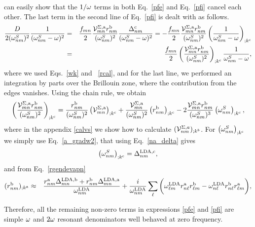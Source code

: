 \documentclass{article}
\begin{document}
can easily show that the $1/\omega$ terms in both Eq.~\eqref{pfe} and Eq.~\eqref{pfi}
cancel each other.
The last term in the second line of Eq.~\eqref{pfi} is dealt with as
follows.
\begin{eqnarray}\label{dresn}
\frac{D}{2(\omega^S_{nm})^2}\frac{1}{(\omega^S_{nm}-\omega)^2}
&=&
\frac{f_{mn}}{2}\frac{{\mathbf{\cal V}}^{\Sigma,\mathrm{a}}_{mn}r^{\mathrm{b}}_{nm}}{(\omega^S_{nm})^2}
\frac{\Delta^{\mathrm{c}}_{nm}}{(\omega^S_{nm}-\omega)^2} 
=
-
\frac{f_{mn}}{2}
\frac{{\mathbf{\cal V}}^{\Sigma,\mathrm{a}}_{mn}r^{\mathrm{b}}_{nm}}{(\omega^S_{nm})^2}
\left(
\frac{1}{\omega^S_{nm}-\omega}
\right)_{;k^{\mathrm{c}}}
\nonumber\\
&=&
\frac{f_{mn}}{2}
\left(
\frac{{\mathbf{\cal V}}^{\Sigma,\mathrm{a}}_{mn}r^{\mathrm{b}}_{nm}}{(\omega^S_{nm})^2}
\right)_{;k^{\mathrm{c}}}
\frac{1}{\omega^S_{nm}-\omega}
,
\end{eqnarray} 
where we used Eqs.~\eqref{wk} and ~\eqref{rcal}, and for the last
line, we performed an
integration by parts over the Brillouin zone,
where the contribution from the edges vanishes.\cite{ashcroft_solid_1976}
Using the chain rule, we obtain
\begin{eqnarray}\label{chrn1}
\left(
\frac{{\mathbf{\cal V}}^{\Sigma,\mathrm{a}}_{mn}r^{\mathrm{b}}_{nm}}{(\omega^S_{nm})^2}
\right)_{;k^{\mathrm{c}}}
=
\frac{r^{\mathrm{b}}_{nm}}{(\omega^S_{nm})^2}
\left(
{\mathbf{\cal V}} ^{\Sigma,\mathrm{a}}_{mn}
\right)_{;k^{\mathrm{c}}}
+
\frac{{\mathbf{\cal V}}^{\Sigma,\mathrm{a}}_{mn}}{(\omega^S_{nm})^2}
\left(
r^{\mathrm{b}}_{nm}
\right)_{;k^{\mathrm{c}}}
-
2\frac{{\mathbf{\cal V}}^{\Sigma,\mathrm{a}}_{mn}r^{\mathrm{b}}_{nm}}{(\omega^S_{nm})^3}
\left(
\omega^S_{nm}
\right)_{;k^{\mathrm{c}}}
,
\end{eqnarray}
where in the appendix \ref{calvs} 
we show how to calculate $({\mathbf{\cal V}}^{\Sigma,a}_{nm})_{;k^b}$.
For 
$\left(\omega^S_{nm}\right)_{;k^{\mathrm{c}}}$
 we simply use
Eq.~\eqref{a_gradw2}, that using Eq.~\eqref{na_delta} gives
\begin{equation}\label{eli.1}
\left(\omega^S_{nm}\right)_{;k^{\mathrm{c}}}
=\Delta^{\mathrm{LDA},\mathrm{c}}_{nm}
,
\end{equation}
and from Eq.~\eqref{rgendevapn}
\begin{eqnarray}\label{eli.2}
(r^{\mathrm{b}}_{nm})_{;k^{\mathrm{a}}}
&\approx&
\frac{
r^{\mathrm{a}}_{nm}
\Delta^{\mathrm{LDA},\mathrm{b}}_{mn}
+r^{\mathrm{b}}_{nm}
\Delta^{\mathrm{LDA},\mathrm{a}}_{mn}
}
{\omega^{\mathrm{LDA}}_{nm}}
+
\frac{i}{\omega^{\mathrm{LDA}}_{nm}}
\sum_{\ell}
\bigg(
\omega^{\mathrm{LDA}}_{\ell m}
r^{\mathrm{a}}_{n\ell}
r^{\mathrm{b}}_{\ell m}
-
\omega^{\mathrm{LDA}}_{n\ell}
r^{\mathrm{b}}_{n\ell}
r^{\mathrm{a}}_{\ell m}
\bigg)
,
\end{eqnarray}



Therefore, all the remaining non-zero terms in expressions \eqref{pfe}
and \eqref{pfi} 
are simple $\omega$ and $2\omega$ resonant denominators well behaved at zero
frequency. 
\end{document}
